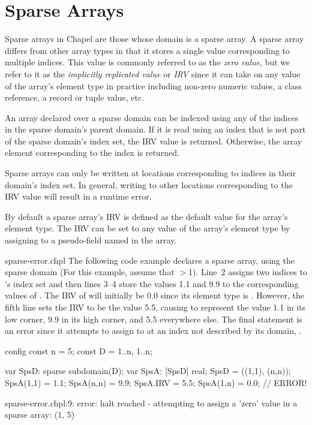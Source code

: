 %
%


\section{Sparse Arrays}
\label{Sparse_Arrays}

Sparse arrays in Chapel are those whose domain is a sparse array.  A
sparse array differs from other array types in that it stores a single
value corresponding to multiple indices.  This value is commonly
referred to as the \emph{zero value}, but we refer to it as the
\emph{implicitly replicated value} or \emph{IRV} since it can take
on any value of the array's element type in practice including
non-zero numeric values, a class reference, a record or tuple value,
etc.

An array declared over a sparse domain can be indexed using any of the
indices in the sparse domain's parent domain.  If it is read using an
index that is not part of the sparse domain's index set, the IRV value
is returned.  Otherwise, the array element corresponding to the index
is returned.

Sparse arrays can only be written at locations corresponding to
indices in their domain's index set.  In general, writing to other
locations corresponding to the IRV value will result in a runtime
error.

By default a sparse array's IRV is defined as the default value for
the array's element type.  The IRV can be set to any value of the
array's element type by assigning to a pseudo-field named 
in the array.

\begin{chapelexample}{sparse-error.chpl}
The following code example declares a sparse array,  using
the sparse domain  (For this example, assume that
$>$1).  Line~2 assigns two indices to 's index set
and then lines 3--4 store the values 1.1 and 9.9 to the corresponding
values of .  The IRV of  will initially be 0.0
since its element type is .  However, the fifth line sets
the IRV to be the value 5.5, causing  to represent the
value 1.1 in its low corner, 9.9 in its high corner, and 5.5
everywhere else.  The final statement is an error since it attempts to
assign to  at an index not described by its domain,
.

\begin{chapelpre}
config const n = 5;
const D = {1..n, 1..n};
\end{chapelpre}
\begin{chapel}
var SpsD: sparse subdomain(D);
var SpsA: [SpsD] real;
SpsD = ((1,1), (n,n));
SpsA(1,1) = 1.1;
SpsA(n,n) = 9.9;
SpsA.IRV = 5.5;
SpsA(1,n) = 0.0;  // ERROR!
\end{chapel}
\begin{chapeloutput}
sparse-error.chpl:9: error: halt reached - attempting to assign a 'zero' value in a sparse array: (1, 5)
\end{chapeloutput}
\end{chapelexample}



